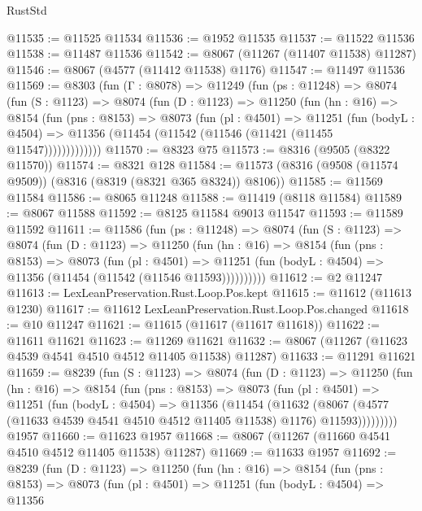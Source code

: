 \begin{lexlean}{RustStd}
\begin{coremodule}
@11535 := @11525 @11534
@11536 := @1952 @11535
@11537 := @11522 @11536
@11538 := @11487 @11536
@11542 := @8067 (@11267 (@11407 @11538) @11287)
@11546 := @8067 (@4577 (@11412 @11538) @1176)
@11547 := @11497 @11536
@11569 := @8303
    (fun (Γ : @8078) =>
    @11249
      (fun (ps : @11248) =>
      @8074
        (fun (S : @1123) =>
        @8074
          (fun (D : @1123) =>
          @11250
            (fun (hn : @16) =>
            @8154
              (fun (pns : @8153) =>
              @8073
                (fun (pl : @4501) =>
                @11251
                  (fun (bodyL : @4504) =>
                  @11356 (@11454 (@11542 (@11546 (@11421 (@11455 @11547)))))))))))))
@11570 := @8323 @75
@11573 := @8316 (@9505 (@8322 @11570))
@11574 := @8321 @128
@11584 := @11573 (@8316 (@9508 (@11574 @9509)) (@8316 (@8319 (@8321 @365 @8324)) @8106))
@11585 := @11569 @11584
@11586 := @8065 @11248
@11588 := @11419 (@8118 @11584)
@11589 := @8067 @11588
@11592 := @8125 @11584 @9013 @11547
@11593 := @11589 @11592
@11611 := @11586
    (fun (ps : @11248) =>
    @8074
      (fun (S : @1123) =>
      @8074
        (fun (D : @1123) =>
        @11250
          (fun (hn : @16) =>
          @8154
            (fun (pns : @8153) =>
            @8073
              (fun (pl : @4501) =>
              @11251 (fun (bodyL : @4504) => @11356 (@11454 (@11542 (@11546 @11593))))))))))
@11612 := @2 @11247
@11613 := LexLeanPreservation.Rust.Loop.Pos.kept
@11615 := @11612 (@11613 @1230)
@11617 := @11612 LexLeanPreservation.Rust.Loop.Pos.changed
@11618 := @10 @11247
@11621 := @11615 (@11617 (@11617 @11618))
@11622 := @11611 @11621
@11623 := @11269 @11621
@11632 := @8067 (@11267 (@11623 @4539 @4541 @4510 @4512 @11405 @11538) @11287)
@11633 := @11291 @11621
@11659 := @8239
    (fun (S : @1123) =>
    @8074
      (fun (D : @1123) =>
      @11250
        (fun (hn : @16) =>
        @8154
          (fun (pns : @8153) =>
          @8073
            (fun (pl : @4501) =>
            @11251
              (fun (bodyL : @4504) =>
              @11356
                (@11454
                  (@11632
                    (@8067
                      (@4577 (@11633 @4539 @4541 @4510 @4512 @11405 @11538) @1176)
                      @11593)))))))))
    @1957
@11660 := @11623 @1957
@11668 := @8067 (@11267 (@11660 @4541 @4510 @4512 @11405 @11538) @11287)
@11669 := @11633 @1957
@11692 := @8239
    (fun (D : @1123) =>
    @11250
      (fun (hn : @16) =>
      @8154
        (fun (pns : @8153) =>
        @8073
          (fun (pl : @4501) =>
          @11251
            (fun (bodyL : @4504) =>
            @11356

\end{coremodule}
\end{lexlean}
